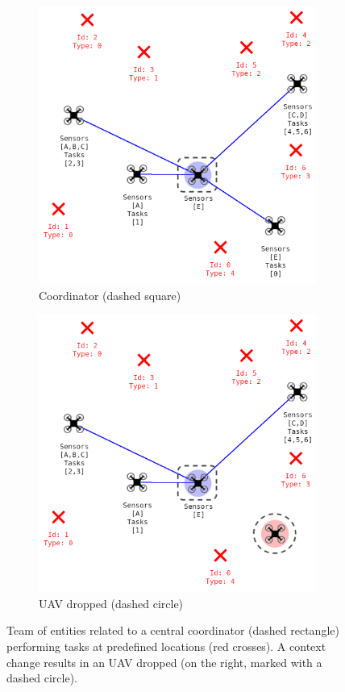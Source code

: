 \begin{figure}[!htbp]
	\centering
	\begin{subfigure}[t]{.45\textwidth}
	\centering
	    \includegraphics[width=0.95\linewidth]{img/C2Drones1-V4-dashed.png}
	    \caption{Coordinator (dashed square)\label{fig:example-a}}
	\end{subfigure}
	\begin{subfigure}[t]{.45\textwidth}
	\centering
	    \includegraphics[width=0.95\linewidth]{img/C2Drones2-V4-dashed.png}
	    \caption{UAV dropped (dashed circle)\label{fig:example-b}}
	\end{subfigure}
	\caption{Team of entities related to a central coordinator (dashed rectangle) performing tasks at predefined locations (red crosses). A context change results in an UAV dropped (on the right, marked with a dashed circle).}
	\label{fig:example}
\end{figure}

